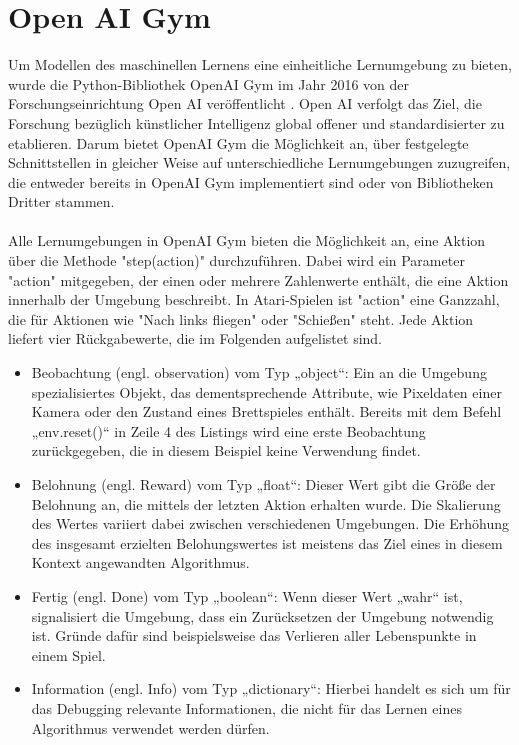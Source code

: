 \section{Open AI Gym}
\label{sec:Gym}
Um Modellen des maschinellen Lernens eine einheitliche Lernumgebung zu bieten, wurde die Python-Bibliothek OpenAI Gym im Jahr 2016 von der Forschungseinrichtung Open AI veröffentlicht \cite{brockman2016}. Open AI verfolgt das Ziel, die Forschung bezüglich künstlicher Intelligenz global offener und standardisierter zu etablieren. Darum bietet OpenAI Gym die Möglichkeit an, über festgelegte Schnittstellen in gleicher Weise auf unterschiedliche Lernumgebungen zuzugreifen, die entweder bereits in OpenAI Gym implementiert sind oder von Bibliotheken Dritter stammen.
\\
\\
Alle Lernumgebungen in OpenAI Gym bieten die Möglichkeit an, eine Aktion über die Methode "step(action)" durchzuführen. Dabei wird ein Parameter "action" mitgegeben, der einen oder mehrere Zahlenwerte enthält, die eine Aktion innerhalb der Umgebung beschreibt. In Atari-Spielen ist "action" eine Ganzzahl, die für Aktionen wie "Nach links fliegen" oder "Schießen" steht. Jede Aktion liefert vier Rückgabewerte, die im Folgenden aufgelistet sind.
\begin{itemize}
	\item Beobachtung (engl. observation) vom Typ „object“: Ein an die Umgebung spezialisiertes Objekt, das dementsprechende Attribute, wie Pixeldaten einer Kamera oder den Zustand eines Brettspieles enthält. Bereits mit dem Befehl „env.reset()“ in Zeile 4 des Listings wird eine erste Beobachtung zurückgegeben, die in diesem Beispiel keine Verwendung findet.
	\item Belohnung (engl. Reward) vom Typ „float“: Dieser Wert gibt die Größe der Belohnung an, die mittels der letzten Aktion erhalten wurde. Die Skalierung des Wertes variiert dabei zwischen verschiedenen Umgebungen. Die Erhöhung des insgesamt erzielten Belohungswertes ist meistens das Ziel eines in diesem Kontext angewandten Algorithmus.
	\item Fertig (engl. Done) vom Typ „boolean“: Wenn dieser Wert „wahr“ ist, signalisiert die Umgebung, dass ein Zurücksetzen der Umgebung notwendig ist. Gründe dafür sind beispielsweise das Verlieren aller Lebenspunkte in einem Spiel.
	\item Information (engl. Info) vom Typ „dictionary“: Hierbei handelt es sich um für das Debugging relevante Informationen, die nicht für das Lernen eines Algorithmus verwendet werden dürfen.
\end{itemize}
